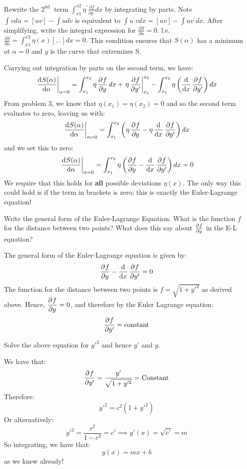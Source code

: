 \begin{p}
Rewrite the $2^{\text {nd }}$ term $\int_{x 1}^{x 2} \eta^{\prime} \frac{\partial f}{\partial y^{\prime}} d x$ by integrating by parts. Note $\int v d u=[u v]-\int u d v$ is equivalent to $\int u^{\prime} v d x=[u v]-\int u v^{\prime} d x$. After simplifying, write the integral expression for $\frac{\partial S}{\partial \alpha}=0 .$ l.e. $\frac{\partial S}{\partial \alpha}= \int_{x 1}^{x 2} \eta(x)[\ldots] d x=0 .$ This condition ensures that $S(\alpha)$ has a minimum at $\alpha=0$ and $y$ is the curve that extremizes S.
\end{p}
\begin{s}
Carrying out integration by parts on the second term, we have:
\[\left. \dod{S(\alpha)}{\alpha}\right|_{\alpha = 0} = \int_{x_1}^{x_2} \eta \dpd{f}{y} dx + \left. \eta\dpd{f}{y'}\right|_{x_1}^{x_2} - \int_{x_1}^{x_2}\eta\left(\dod{}{x}\dpd{f}{y'}\right)dx \]
From problem 3, we know that $\eta(x_1) = \eta(x_2) = 0$ and so the second term evaluates to zero, leaving us with:
\[\left. \dod{S(\alpha)}{\alpha}\right|_{\alpha = 0} = \int_{x_1}^{x_2} \left(\eta\dpd{f}{y} - \eta\dod{}{x}\dpd{f}{y'}\right)dx\]
and we set this to zero:
\[\left. \dod{S(\alpha)}{\alpha}\right|_{\alpha = 0} = \int_{x_1}^{x_2}\eta\left(\dpd{f}{y} - \dod{}{x}\dpd{f}{y'}\right)dx = 0\]
We require that this holds for \textbf{all} possible deviations $\eta(x)$. The only way this could hold is if the term in brackets is zero; this is exactly the Euler-Lagrange equation!
\end{s}

\begin{p}
Write the general form of the Euler-Lagrange Equation. What is the function $f$ for the distance between two points? What does this say about $\pd{f}{y}$ in the E-L equation?
\end{p}
\begin{s}
The general form of the Euler-Lagrange equation is given by:
\[\dpd{f}{y}  - \dod{}{x}\dpd{f}{y'} = 0\]
The function for the distance between two points is $f = \sqrt{1+ y'^2}$ as derived above. Hence, $\dpd{f}{y} = 0$, and therefore by the Euler Lagrange equation:
\[\dpd{f}{y'} = \text{constant}\]
\end{s}

\begin{p}
Solve the above equation for $y'^2$ and hence $y'$ and $y$.
\end{p}
\begin{s}
We have that:
\[\dpd{f}{y'} = \frac{y'}{\sqrt{1+y'^2}} = \text{Constant}\]
Therefore:
\[y'^2 = c^2(1+y'^2)\]
Or alternatively:
\[y'^2 = \frac{c^2}{1-c^2} = c' \implies y'(x) = \sqrt{c'} = m\]
So integrating, we have that:
\[y(x) = mx + b\]
as we knew already!
\end{s}